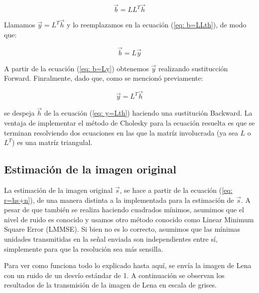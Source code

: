 \begin{equation} 
\vec{b} = L L^T \vec{h} 
\label{eq: b=LLth}
\end{equation} 

Llamamos $\vec{y} = L^T \vec{h}$ y lo reemplazamos en la ecuaci\'on (\ref{eq: b=LLth}), de modo que:

\begin{equation} 
\vec{b} = L \vec{y}
\label{eq: b=Ly}
\end{equation} 

A partir de la ecuaci\'on (\ref{eq: b=Ly}) obtenemos $ \vec{y}$ realizando sustitucci\'on Forward. Finralmente, dado que, como se mencion\'o previamente:

 \begin{equation} 
\vec{y} = L^T \vec{h} 
\label{eq: y=Lth}
\end{equation}

se despeja $\vec{h}$ de la ecuaci\'on (\ref{eq: y=Lth}) haciendo una sustituci\'on Backward. La ventaja de implementar el m\'etodo de Cholesky para la ecuaci\'on resuelta es que se terminan resolviendo dos ecuaciones en las que la matr\'iz involucrada (ya sea $L$ o $L^T$) es una matr\'iz triangulal.

\subsection{Estimaci\'on de la imagen original}

La estimaci\'on de la imagen original $\vec{s}$, se hace a partir de la ecuaci\'on (\ref{eq: r=hs+n}), de una manera distinta a la implementada para la estimaci\'on de  $\vec{s}$. A pesar de que tambi\'en se realiza haciendo cuadrados m\'inimos, asumimos que el nivel de ruido es conocido y usamos otro m\'etodo  conocido como Linear Minimum Square Error (LMMSE). Si bien no es lo correcto, asumimos que las m\'inimas unidades transmitidas en la se\~nal enviada son independientes entre s\'i, simplemente para que la resoluci\'on sea m\'as sensilla. 


Para ver como funciona todo lo explicado hasta aqu\'i, se env\'ia la imagen de Lena con un ruido de un desv\'io est\'andar de 1. A continuaci\'on se observan los resultados de la transmisi\'on de la imagen de Lena en escala de grises.
 
